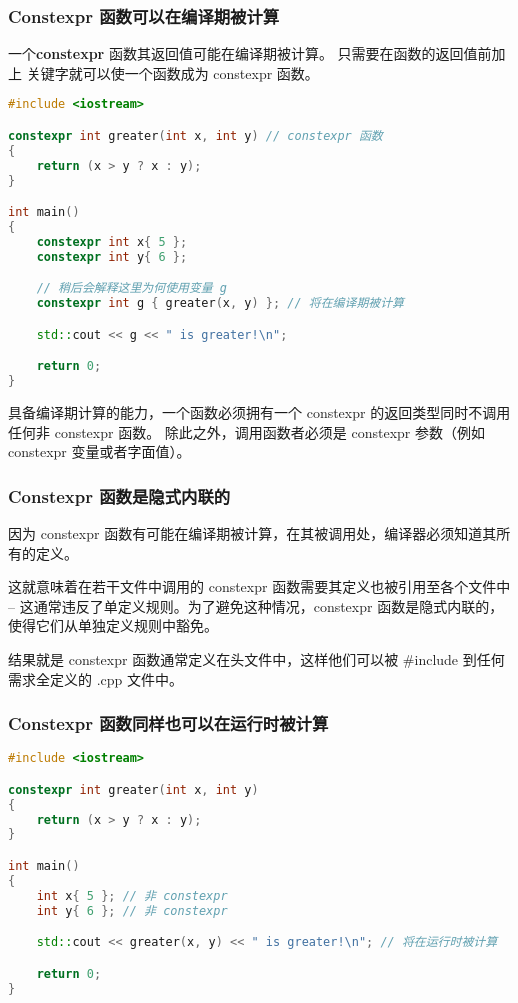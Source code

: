 \documentclass[../../LearnCpp.tex]{subfiles}
\begin{document}

\subsubsection*{Constexpr 函数可以在编译期被计算}

一个\textbf{constexpr} 函数其返回值可能在编译期被计算。
只需要在函数的返回值前加上  关键字就可以使一个函数成为 constexpr 函数。

\begin{lstlisting}[language=C++]
#include <iostream>

constexpr int greater(int x, int y) // constexpr 函数
{
    return (x > y ? x : y);
}

int main()
{
    constexpr int x{ 5 };
    constexpr int y{ 6 };

    // 稍后会解释这里为何使用变量 g
    constexpr int g { greater(x, y) }; // 将在编译期被计算

    std::cout << g << " is greater!\n";

    return 0;
}
\end{lstlisting}

具备编译期计算的能力，一个函数必须拥有一个 constexpr 的返回类型同时不调用任何非 constexpr 函数。
除此之外，调用函数者必须是 constexpr 参数（例如 constexpr 变量或者字面值）。

\subsubsection*{Constexpr 函数是隐式内联的}

因为 constexpr 函数有可能在编译期被计算，在其被调用处，编译器必须知道其所有的定义。

这就意味着在若干文件中调用的 constexpr 函数需要其定义也被引用至各个文件中 -- 这通常违反了单定义规则。为了避免这种情况，constexpr 函数是隐式内联的，使得它们从单独定义规则中豁免。

结果就是 constexpr 函数通常定义在头文件中，这样他们可以被 \#include 到任何需求全定义的 .cpp 文件中。

\subsubsection*{Constexpr 函数同样也可以在运行时被计算}

\begin{lstlisting}[language=C++]
#include <iostream>

constexpr int greater(int x, int y)
{
    return (x > y ? x : y);
}

int main()
{
    int x{ 5 }; // 非 constexpr
    int y{ 6 }; // 非 constexpr

    std::cout << greater(x, y) << " is greater!\n"; // 将在运行时被计算

    return 0;
}
\end{lstlisting}
\end{document}
